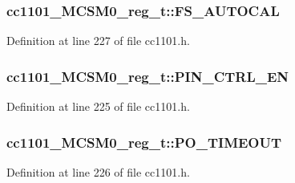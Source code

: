 \subsubsection[{\texorpdfstring{F\+S\+\_\+\+A\+U\+T\+O\+C\+AL}{FS_AUTOCAL}}]{ cc1101\+\_\+\+M\+C\+S\+M0\+\_\+reg\+\_\+t\+::\+F\+S\+\_\+\+A\+U\+T\+O\+C\+AL}\hypertarget{structcc1101___m_c_s_m0__reg__t_a84a171617083c6f904bafc50adc6ef90}{}\label{structcc1101___m_c_s_m0__reg__t_a84a171617083c6f904bafc50adc6ef90}


Definition at line 227 of file cc1101.\+h.

\subsubsection[{\texorpdfstring{P\+I\+N\+\_\+\+C\+T\+R\+L\+\_\+\+EN}{PIN_CTRL_EN}}]{ cc1101\+\_\+\+M\+C\+S\+M0\+\_\+reg\+\_\+t\+::\+P\+I\+N\+\_\+\+C\+T\+R\+L\+\_\+\+EN}\hypertarget{structcc1101___m_c_s_m0__reg__t_ad67d9ce01ee319f993a0efeea353bd27}{}\label{structcc1101___m_c_s_m0__reg__t_ad67d9ce01ee319f993a0efeea353bd27}


Definition at line 225 of file cc1101.\+h.

\subsubsection[{\texorpdfstring{P\+O\+\_\+\+T\+I\+M\+E\+O\+UT}{PO_TIMEOUT}}]{ cc1101\+\_\+\+M\+C\+S\+M0\+\_\+reg\+\_\+t\+::\+P\+O\+\_\+\+T\+I\+M\+E\+O\+UT}\hypertarget{structcc1101___m_c_s_m0__reg__t_a4f679e86c5ec718fd6e8e4e8ae478728}{}\label{structcc1101___m_c_s_m0__reg__t_a4f679e86c5ec718fd6e8e4e8ae478728}


Definition at line 226 of file cc1101.\+h.

